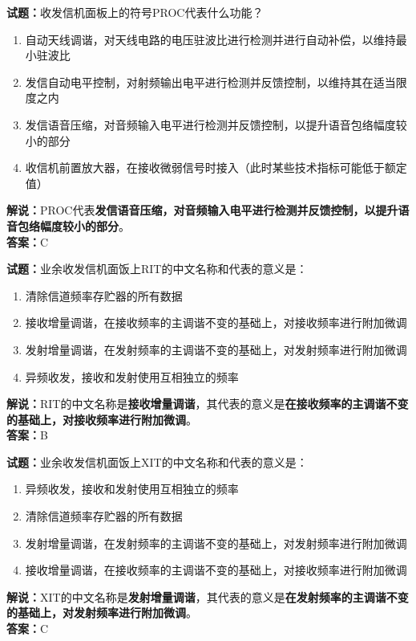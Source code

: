 \documentclass{ctexbook}
\begin{document}
\bigskip


\noindent\textbf{试题：}收发信机面板上的符号PROC代表什么功能？
\begin{enumerate}[leftmargin=3em]
\item 自动天线调谐，对天线电路的电压驻波比进行检测并进行自动补偿，以维持最小驻波比
\item 发信自动电平控制，对射频输出电平进行检测并反馈控制，以维持其在适当限度之内
\item 发信语音压缩，对音频输入电平进行检测并反馈控制，以提升语音包络幅度较小的部分
\item 收信机前置放大器，在接收微弱信号时接入（此时某些技术指标可能低于额定值）
\end{enumerate}
\noindent\textbf{解说：}PROC代表\textbf{发信语音压缩，对音频输入电平进行检测并反馈控制，以提升语音包络幅度较小的部分}。\\\noindent\textbf{答案：}C



\bigskip


\noindent\textbf{试题：}业余收发信机面饭上RIT的中文名称和代表的意义是：
\begin{enumerate}[leftmargin=3em]
\item 清除信道频率存贮器的所有数据
\item 接收增量调谐，在接收频率的主调谐不变的基础上，对接收频率进行附加微调
\item 发射增量调谐，在发射频率的主调谐不变的基础上，对发射频率进行附加微调
\item 异频收发，接收和发射使用互相独立的频率
\end{enumerate}
\noindent\textbf{解说：}RIT的中文名称是\textbf{接收增量调谐}，其代表的意义是\textbf{在接收频率的主调谐不变的基础上，对接收频率进行附加微调}。\\\noindent\textbf{答案：}B




\bigskip


\noindent\textbf{试题：}业余收发信机面饭上XIT的中文名称和代表的意义是：
\begin{enumerate}[leftmargin=3em]
\item 异频收发，接收和发射使用互相独立的频率
\item 清除信道频率存贮器的所有数据
\item 发射增量调谐，在发射频率的主调谐不变的基础上，对发射频率进行附加微调
\item 接收增量调谐，在接收频率的主调谐不变的基础上，对接收频率进行附加微调
\end{enumerate}
\noindent\textbf{解说：}XIT的中文名称是\textbf{发射增量调谐}，其代表的意义是\textbf{在发射频率的主调谐不变的基础上，对发射频率进行附加微调}。\\\noindent\textbf{答案：}C
\end{document}
